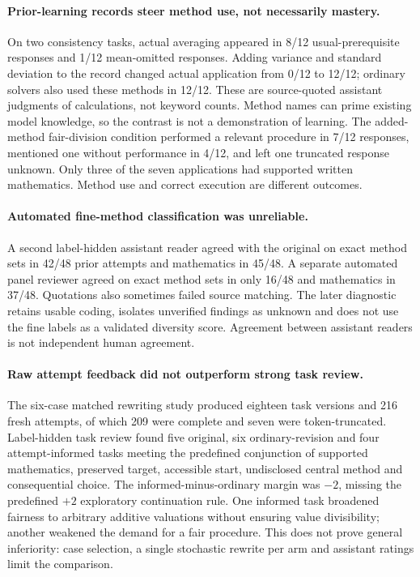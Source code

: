 \paragraph{Prior-learning records steer method use, not necessarily mastery.}
On two consistency tasks, actual averaging appeared in 8/12 usual-prerequisite responses and 1/12 mean-omitted responses. Adding variance and standard deviation to the record changed actual application from 0/12 to 12/12; ordinary solvers also used these methods in 12/12. These are source-quoted assistant judgments of calculations, not keyword counts. Method names can prime existing model knowledge, so the contrast is not a demonstration of learning. The added-method fair-division condition performed a relevant procedure in 7/12 responses, mentioned one without performance in 4/12, and left one truncated response unknown. Only three of the seven applications had supported written mathematics. Method use and correct execution are different outcomes.

\paragraph{Automated fine-method classification was unreliable.}
A second label-hidden assistant reader agreed with the original on exact method sets in 42/48 prior attempts and mathematics in 45/48. A separate automated panel reviewer agreed on exact method sets in only 16/48 and mathematics in 37/48. Quotations also sometimes failed source matching. The later diagnostic retains usable coding, isolates unverified findings as unknown and does not use the fine labels as a validated diversity score. Agreement between assistant readers is not independent human agreement.

\paragraph{Raw attempt feedback did not outperform strong task review.}
The six-case matched rewriting study produced eighteen task versions and 216 fresh attempts, of which 209 were complete and seven were token-truncated. Label-hidden task review found five original, six ordinary-revision and four attempt-informed tasks meeting the predefined conjunction of supported mathematics, preserved target, accessible start, undisclosed central method and consequential choice. The informed-minus-ordinary margin was $-2$, missing the predefined $+2$ exploratory continuation rule. One informed task broadened fairness to arbitrary additive valuations without ensuring value divisibility; another weakened the demand for a fair procedure. This does not prove general inferiority: case selection, a single stochastic rewrite per arm and assistant ratings limit the comparison.

